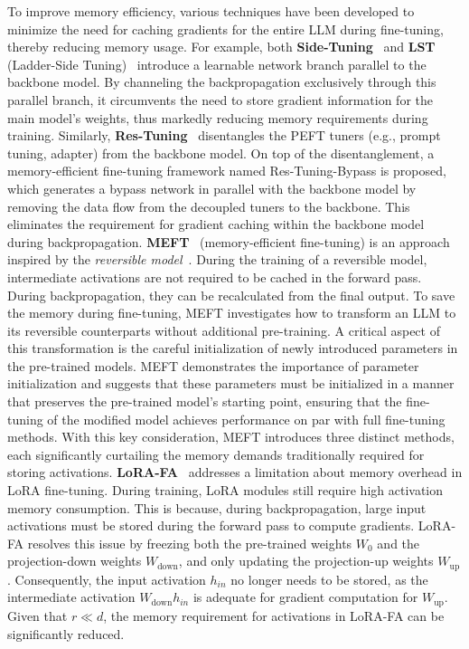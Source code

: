 To improve memory efficiency, various techniques have been developed to minimize the need for caching gradients for the entire LLM during fine-tuning, thereby reducing memory usage. For example, both \textbf{Side-Tuning}~\cite{side-tuning} and \textbf{LST} (Ladder-Side Tuning)~\cite{lst} introduce a learnable network branch parallel to the backbone model. By channeling the backpropagation exclusively through this parallel branch, it circumvents the need to store gradient information for the main model's weights, thus markedly reducing memory requirements during training. Similarly, \textbf{Res-Tuning}~\cite{jiang2023res} disentangles the PEFT tuners (e.g., prompt tuning, adapter) from the backbone model. On top of the disentanglement, a memory-efficient fine-tuning framework named Res-Tuning-Bypass is proposed, which generates a bypass network in parallel with the backbone model by removing the data flow from the decoupled tuners to the backbone. This eliminates the requirement for gradient caching within the backbone model during backpropagation. \textbf{MEFT}~\cite{liao2023make} (memory-efficient fine-tuning) is an approach inspired by the \emph{reversible model}~\cite{gomez2017reversible}. During the training of a reversible model, intermediate activations are not required to be cached in the forward pass. During backpropagation, they can be recalculated from the final output. To save the memory during fine-tuning, MEFT investigates how to transform an LLM to its reversible counterparts without additional pre-training. A critical aspect of this transformation is the careful initialization of newly introduced parameters in the pre-trained models. MEFT demonstrates the importance of parameter initialization and suggests that these parameters must be initialized in a manner that preserves the pre-trained model's starting point, ensuring that the fine-tuning of the modified model achieves performance on par with full fine-tuning methods. With this key consideration, MEFT introduces three distinct methods, each significantly curtailing the memory demands traditionally required for storing activations.
\textbf{LoRA-FA}~\cite{zhang2023lora} addresses a limitation about memory overhead in LoRA fine-tuning. During training, LoRA modules still require high activation memory consumption. This is because, during backpropagation, large input activations must be stored during the forward pass to compute gradients. LoRA-FA resolves this issue by freezing both the pre-trained weights $W_0$ and the projection-down weights $W_\text{down}$, and only updating the projection-up weights $W_\text{up}$. Consequently, the input activation $h_{in}$ no longer needs to be stored, as the intermediate activation $W_\text{down}h_{in}$ is adequate for gradient computation for $W_\text{up}$. Given that $r \ll d$, the memory requirement for activations in LoRA-FA can be significantly reduced.




